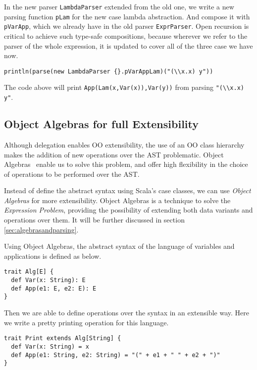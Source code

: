 In the new parser \lstinline{LambdaParser} extended from the old one,
we write a new parsing function \lstinline{pLam} for the new case
lambda abstraction. And compose it with \lstinline{pVarApp}, which we
already have in the old parser \lstinline{ExprParser}. Open recursion
is critical to achieve such type-safe compositions, because wherever
we refer to the parser of the whole expression, it is updated to cover
all of the three case we have now.

\begin{lstlisting}
println(parse(new LambdaParser {}.pVarAppLam)("(\\x.x) y"))
\end{lstlisting}

The code above will print \lstinline{App(Lam(x,Var(x)),Var(y))} from parsing \lstinline{"(\\x.x)} \lstinline{y"}.

\subsection{Object Algebras for full Extensibility}\label{subsec:overview-oa}

Although delegation enables OO extensibility, the use of an OO class
hierarchy makes the addition of new operations over the AST
problematic. Object Algebras~\cite{} enable us to solve this problem, and
offer high flexibility in the choice of operations to be performed
over the AST.


Instead of define the abstract syntax using Scala's case classes, we
can use \textit{Object Algebras} for more extensibility. Object
Algebras is a technique to solve the \textit{Expression Problem},
providing the possibility of extending both data variants and
operations over them. It will be further discussed in section
\ref{sec:algebrasandparsing}.

Using Object Algebras, the abstract syntax of the language of variables and applications is defined as below.

\begin{lstlisting}
trait Alg[E] {
  def Var(x: String): E
  def App(e1: E, e2: E): E
}
\end{lstlisting}

Then we are able to define operations over the syntax in an extensible way. Here we write a pretty printing operation for this language.

\begin{lstlisting}
trait Print extends Alg[String] {
  def Var(x: String) = x
  def App(e1: String, e2: String) = "(" + e1 + " " + e2 + ")"
}
\end{lstlisting}

